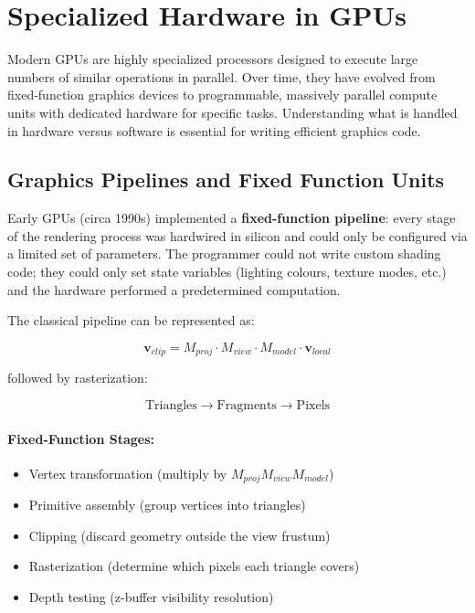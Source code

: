 \documentclass[11pt]{article}
\begin{document}
\section{Specialized Hardware in GPUs}

Modern GPUs are highly specialized processors designed to execute large numbers of similar operations in parallel. Over time, they have evolved from fixed-function graphics devices to programmable, massively parallel compute units with dedicated hardware for specific tasks. Understanding what is handled in hardware versus software is essential for writing efficient graphics code.

\subsection{Graphics Pipelines and Fixed Function Units}

Early GPUs (circa 1990s) implemented a \textbf{fixed-function pipeline}: every stage of the rendering process was hardwired in silicon and could only be configured via a limited set of parameters. The programmer could not write custom shading code; they could only set state variables (lighting colours, texture modes, etc.) and the hardware performed a predetermined computation.

The classical pipeline can be represented as:

\begin{equation}
    \mathbf{v}_{clip} =
    M_{proj} \cdot M_{view} \cdot M_{model} \cdot \mathbf{v}_{local}
\end{equation}

followed by rasterization:

\begin{equation}
    \text{Triangles} \rightarrow \text{Fragments} \rightarrow \text{Pixels}
\end{equation}

\paragraph{Fixed-Function Stages:}

\begin{itemize}
    \item Vertex transformation (multiply by $M_{proj} M_{view} M_{model}$)
    \item Primitive assembly (group vertices into triangles)
    \item Clipping (discard geometry outside the view frustum)
    \item Rasterization (determine which pixels each triangle covers)
    \item Depth testing (z-buffer visibility resolution)
\end{itemize}
\end{document}
